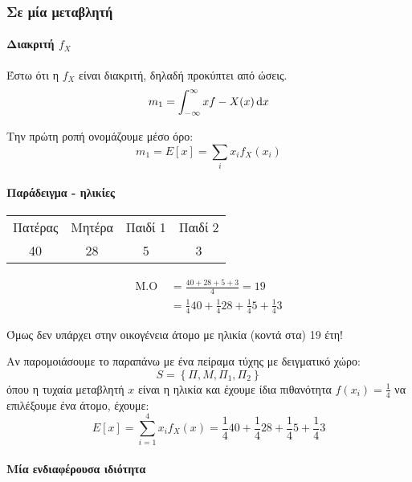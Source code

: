 \documentclass[11pt,a4paper,notitlepage,fleqn,final]{article}
\begin{document}
\subsubsection{Σε μία μεταβλητή}

\paragraph{Διακριτή \( f_X \)}
Έστω ότι η \( f_X \) είναι διακριτή, δηλαδή προκύπτει από ώσεις.
\[
m_1 = \int_{-\infty}^{\infty} xf-X(x)\mathop{}\!\mathrm{d} x
\]

Την πρώτη ροπή ονομάζουμε μέσο όρο:
\[
m_1 = E[x] = \sum_{i} x_i f_X(x_i)
\]

\paragraph{Παράδειγμα - ηλικίες}
\begin{tabular}{cccc}
	Πατέρας & Μητέρα & Παιδί 1 & Παιδί 2 \\
	40 & 28 & 5 & 3 \\
	\end{tabular}
\begin{align*}
\text{Μ.Ο } &= \frac{40+28+5+3}{4} = 19
\\ &= \frac{1}{4}40 + \frac{1}{4}28 + \frac{1}{4}5
+ \frac{1}{4}3
\end{align*}

Όμως δεν υπάρχει στην οικογένεια άτομο με ηλικία (κοντά στα) 19 έτη!

Αν παρομοιάσουμε το παραπάνω με ένα πείραμα τύχης με δειγματικό
χώρο:
\[
S = \left\lbrace \varPi, M, \varPi_1, \varPi_2 \right\rbrace
\]
όπου η τυχαία μεταβλητή \( x \) είναι η ηλικία και έχουμε ίδια
πιθανότητα \( f(x_i) = \frac{1}{4} \) να επιλέξουμε ένα άτομο,
έχουμε:
\[
E[x] = \sum_{i=1}^{4} x_if_X(x) = \frac{1}{4}40 + \frac{1}{4}28 + \frac{1}{4}5 + \frac{1}{4}3
\]
\paragraph{Μία ενδιαφέρουσα ιδιότητα}\hspace{0pt}\par
{}
\end{document}
